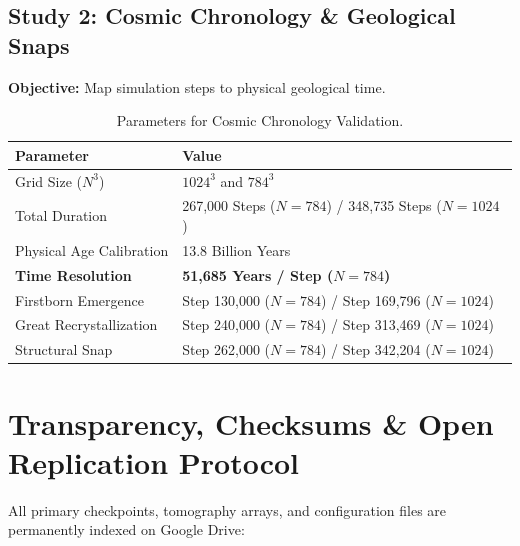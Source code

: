 \documentclass[11pt, twoside]{article}
\begin{document}
\subsection{Study 2: Cosmic Chronology \& Geological Snaps}
\textbf{Objective:} Map simulation steps to physical geological time.
\begin{table}[H]
\centering
\caption{Parameters for Cosmic Chronology Validation.}
\begin{tabular}{@{}ll@{}}
\toprule
\textbf{Parameter} & \textbf{Value} \\ \midrule
Grid Size ($N^3$) & $1024^3$ and $784^3$ \\
Total Duration & 267,000 Steps ($N=784$) / 348,735 Steps ($N=1024$) \\
Physical Age Calibration & 13.8 Billion Years \\
\textbf{Time Resolution} & \textbf{51,685 Years / Step ($N=784$)} \\
Firstborn Emergence & Step 130,000 ($N=784$) / Step 169,796 ($N=1024$) \\
Great Recrystallization & Step 240,000 ($N=784$) / Step 313,469 ($N=1024$) \\
Structural Snap & Step 262,000 ($N=784$) / Step 342,204 ($N=1024$) \\ \bottomrule
\end{tabular}
\end{table}

\section{Transparency, Checksums \& Open Replication Protocol}

All primary checkpoints, tomography arrays, and configuration files are permanently indexed on Google Drive:
\end{document}
